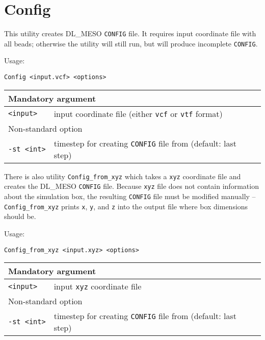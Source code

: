 \section{Config} \label{sec:Config}

This utility creates DL\_MESO \texttt{CONFIG} file. It requires input
coordinate file with all beads; otherwise the utility will still run, but
will produce incomplete \texttt{CONFIG}.

Usage:

\vspace{1em}
\noindent
\texttt{Config <input.vcf> <options>}

\vspace{1em}

\noindent
\begin{tabular}{p{}p{}}
  \toprule
  \multicolumn{2}{l}{Mandatory argument} \\
  \midrule
  \texttt{<input>}  & input coordinate file (either \texttt{vcf} or
    \texttt{vtf} format)\\
  \toprule
  \multicolumn{2}{l}{Non-standard option} \\
  \midrule
  \texttt{-st <int>} & timestep for creating \texttt{CONFIG} file from
    (default: last step) \\
  \bottomrule
\end{tabular}

\vspace{1em}
There is also utility \texttt{Config\_from\_xyz} which takes a \texttt{xyz}
coordinate file and creates the DL\_MESO \texttt{CONFIG} file. Because
\texttt{xyz} file does not contain information about the simulation box,
the resulting \texttt{CONFIG} file must be modified manually --
\texttt{Config\_from\_xyz} prints \texttt{x}, \texttt{y}, and \texttt{z}
into the output file where box dimensions should be.

Usage:

\vspace{1em}
\noindent
\texttt{Config\_from\_xyz <input.xyz> <options>}

\vspace{1em}

\noindent
\begin{tabular}{p{}p{}}
  \toprule
  \multicolumn{2}{l}{Mandatory argument} \\
  \midrule
  \texttt{<input>}  & input \texttt{xyz} coordinate file \\
  \toprule
  \multicolumn{2}{l}{Non-standard option} \\
  \midrule
  \texttt{-st <int>} & timestep for creating \texttt{CONFIG} file from
    (default: last step) \\
  \bottomrule
\end{tabular}
